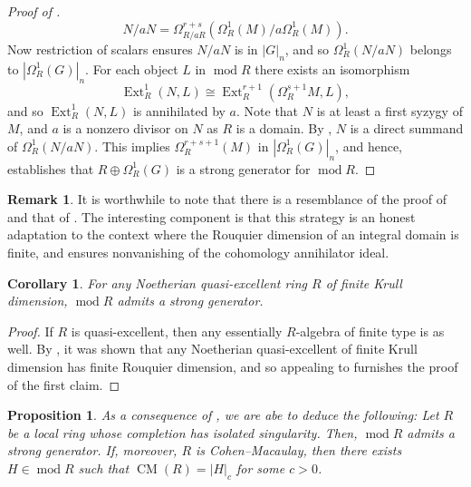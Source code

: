 \documentclass[11pt]{amsart}
\theoremstyle{plain}
\newtheorem{corollary}[theorem]{Corollary}
\newtheorem{proposition}[theorem]{Proposition}
\theoremstyle{definition}
\newtheorem{remark}[theorem]{Remark}
\numberwithin{equation}{section}
\numberwithin{theorem}{section}
\begin{document}
\begin{proof}[Proof of ]
\begin{displaymath}
        N/aN = \Omega^{r+s}_{R/aR} (\Omega^1_R (M)/ a \Omega^1_R (M)).
    \end{displaymath}
    Now restriction of scalars ensures $N/aN $ is in $ |G|_n$, and so $\Omega_R^1 (N/aN) $ belongs to $ |\Omega_R^1 (G)|_n$. For each object $L$ in $ \operatorname{mod}R$ there exists an isomorphism
    \begin{displaymath}
        \operatorname{Ext}_R^1( N, L) \cong \operatorname{Ext}^{r+1}_R ( \Omega_R^{s+1} M,L),
    \end{displaymath}
    and so $\operatorname{Ext}_R^1( N, L)$ is annihilated by $a$. Note that $N$ is at least a first syzygy of $M$, and $a$ is a nonzero divisor on $N$ as $R$ is a domain. By , $N$ is a direct summand of $\Omega_R^1 (N/aN)$. This implies $\Omega_R^{r + s+1} (M) $ in $ |\Omega_R^1 (G)|_n$, and hence, establishes that $R\oplus \Omega^1_R (G)$ is a strong generator for $\operatorname{mod}R$.
\end{proof}

\begin{remark}
    It is worthwhile to note that there is a resemblance of the proof of  and that of \cite[Theorem 5.1]{Iyengar/Takahashi:2016}. The interesting component is that this strategy is an honest adaptation to the context where the Rouquier dimension of an integral domain is finite, and  ensures nonvanishing of the cohomology annihilator ideal.
\end{remark}

\begin{corollary}\label{cor:quasi_excellent_strong_gen}
    For any Noetherian quasi-excellent ring $R$ of finite Krull dimension, $\operatorname{mod}R$ admits a strong generator. 
\end{corollary}

\begin{proof}
    If $R$ is quasi-excellent, then any essentially $R$-algebra of finite type is as well. By \cite[Main Theorem]{Aoki:2021}, it was shown that any Noetherian quasi-excellent of finite Krull dimension has finite Rouquier dimension, and so appealing to  furnishes the proof of the first claim.
\end{proof}

\begin{proposition}\label{prop:cmiso}
    As a consequence of , we are abe to deduce the following: Let $R$ be a local  ring whose completion has isolated singularity. Then, $\operatorname{mod}R$ admits a strong generator. If, moreover, $R$ is Cohen--Macaulay, then there exists $H\in \operatorname{mod } R$ such that $\operatorname{CM}(R)=|H|_c$ for some $c>0$. 
\end{proposition}
\end{document}
